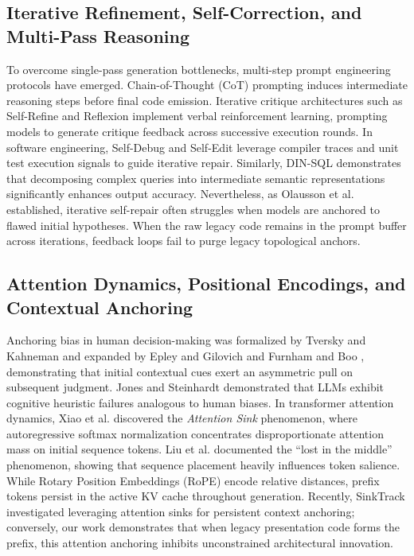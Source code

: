 \documentclass[10pt,journal,compsoc]{IEEEtran}
\begin{document}
\subsection{Iterative Refinement, Self-Correction, and Multi-Pass Reasoning}
To overcome single-pass generation bottlenecks, multi-step prompt engineering protocols have emerged. Chain-of-Thought (CoT) prompting \cite{wei2022chain} induces intermediate reasoning steps before final code emission. Iterative critique architectures such as Self-Refine \cite{madaan2023selfrefine} and Reflexion \cite{shinn2023reflexion} implement verbal reinforcement learning, prompting models to generate critique feedback across successive execution rounds. In software engineering, Self-Debug \cite{chen2023teaching} and Self-Edit \cite{zhang2023selfedit} leverage compiler traces and unit test execution signals to guide iterative repair. Similarly, DIN-SQL \cite{pourreza2023dinsql} demonstrates that decomposing complex queries into intermediate semantic representations significantly enhances output accuracy. Nevertheless, as Olausson et al. \cite{olausson2023selfrepair} established, iterative self-repair often struggles when models are anchored to flawed initial hypotheses. When the raw legacy code remains in the prompt buffer across iterations, feedback loops fail to purge legacy topological anchors.

\subsection{Attention Dynamics, Positional Encodings, and Contextual Anchoring}
Anchoring bias in human decision-making was formalized by Tversky and Kahneman \cite{tversky1974judgment} and expanded by Epley and Gilovich \cite{epley2006anchoring} and Furnham and Boo \cite{furnham2011literature}, demonstrating that initial contextual cues exert an asymmetric pull on subsequent judgment. Jones and Steinhardt \cite{jones2022capturing} demonstrated that LLMs exhibit cognitive heuristic failures analogous to human biases. In transformer attention dynamics, Xiao et al. \cite{xiao2023efficient} discovered the \textit{Attention Sink} phenomenon, where autoregressive softmax normalization concentrates disproportionate attention mass on initial sequence tokens. Liu et al. \cite{liu2023lost} documented the ``lost in the middle'' phenomenon, showing that sequence placement heavily influences token salience. While Rotary Position Embeddings (RoPE) \cite{su2024roformer} encode relative distances, prefix tokens persist in the active KV cache throughout generation. Recently, SinkTrack \cite{liu2026sinktrack} investigated leveraging attention sinks for persistent context anchoring; conversely, our work demonstrates that when legacy presentation code forms the prefix, this attention anchoring inhibits unconstrained architectural innovation.
\end{document}
